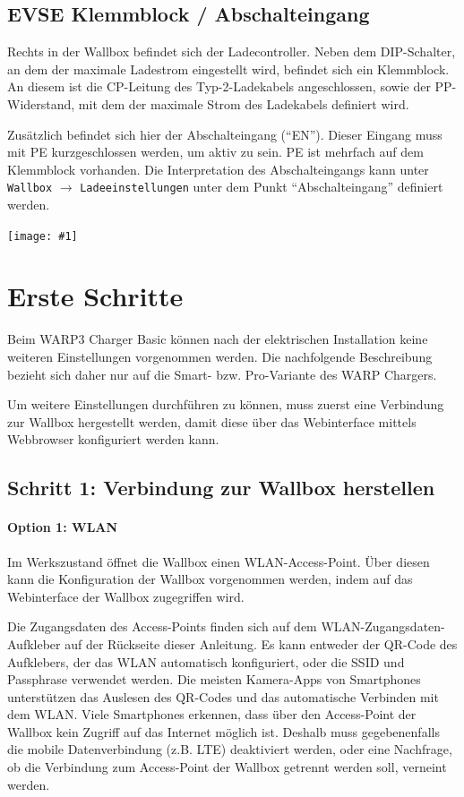\documentclass[a4paper,10pt]{article}
\newcommand{\gfx}[1]{\texttt{[image: \#1]}}
\begin{document}
\begin{multicols*}{2}
	\subsection{EVSE Klemmblock / Abschalteingang}\label{abschalteingang}
	Rechts in der Wallbox befindet sich der Ladecontroller. Neben dem DIP-Schalter,
	an dem der maximale Ladestrom eingestellt wird, befindet sich ein
	Klemmblock. An diesem ist die CP-Leitung des Typ-2-Ladekabels angeschlossen,
	sowie der PP-Widerstand, mit dem der maximale Strom des Ladekabels
	definiert wird.

	Zusätzlich befindet sich hier der Abschalteingang (\enquote{EN}).
	Dieser Eingang muss mit PE kurzgeschlossen werden, um aktiv zu sein. PE ist
	mehrfach auf dem Klemmblock vorhanden. Die Interpretation des Abschalteingangs kann unter \texttt{Wallbox} $\rightarrow$ \texttt{Ladeeinstellungen} unter dem Punkt \enquote{Abschalteingang} definiert werden.

    \gfx{./img_warp3/resized/evse_clamp.jpg}

    \newpage
    \section{Erste Schritte}\label{setup}

    Beim WARP3 Charger Basic können nach der elektrischen Installation
    keine weiteren Einstellungen vorgenommen werden. Die nachfolgende
    Beschreibung bezieht sich daher nur auf die Smart- bzw. Pro-Variante des WARP
    Chargers.

    Um weitere Einstellungen durchführen zu können, muss zuerst eine Verbindung
    zur Wallbox hergestellt werden, damit diese über das Webinterface mittels
	Webbrowser konfiguriert werden kann.

    \subsection{Schritt 1: Verbindung zur Wallbox herstellen}

    \paragraph{Option 1: WLAN}
    Im Werkszustand öffnet die Wallbox einen WLAN-Access-Point. Über diesen kann
    die Konfiguration der Wallbox vorgenommen werden, indem auf das
    Webinterface der Wallbox zugegriffen wird.

    Die Zugangsdaten des Access-Points finden sich auf dem WLAN-Zugangsdaten-Aufkleber
    auf der Rückseite dieser Anleitung. Es kann entweder der QR-Code des Aufklebers,
    der das WLAN automatisch konfiguriert, oder die SSID und Passphrase verwendet werden.
    Die meisten Kamera-Apps von Smartphones unterstützen das Auslesen des
    QR-Codes und das automatische Verbinden mit dem WLAN. Viele Smartphones
    erkennen, dass über den Access-Point der Wallbox kein Zugriff auf das
    Internet möglich ist. Deshalb muss gegebenenfalls die mobile Datenverbindung (z.B. LTE) deaktiviert werden, oder eine Nachfrage, ob die Verbindung zum Access-Point der Wallbox getrennt werden soll, verneint werden.


\end{multicols*}
\end{document}
